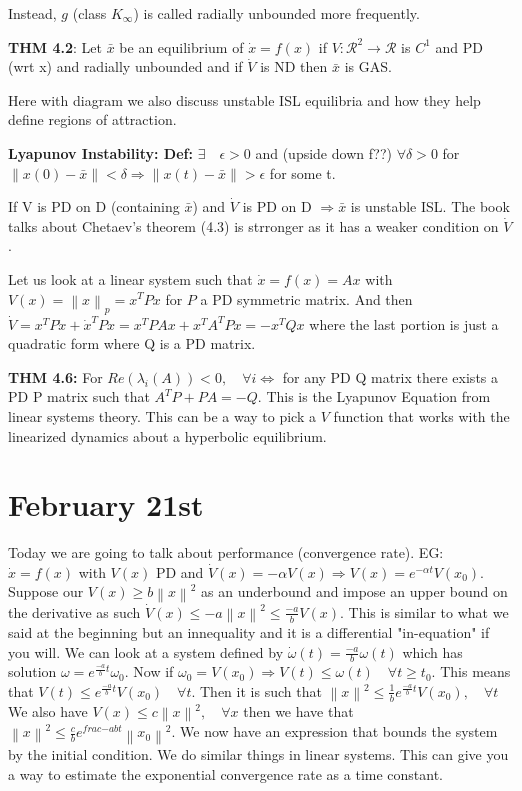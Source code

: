 \documentclass[11pt]{article}
\newcommand{\norm}[1]{\left\lVert#1\right\rVert}
\begin{document}
Instead, $g$ (class $K_\infty$) is called radially unbounded more frequently.

\textbf{THM 4.2}: Let $\bar{x}$ be an equilibrium of $\dot{x} = f(x)$ if $V:\mathcal{R}^2 \rightarrow \mathcal{R}$ is $C^1$ and PD (wrt x) and radially unbounded and if $\dot{V}$ is ND then $\bar{x}$ is GAS.


Here with diagram we also discuss unstable ISL equilibria and how they help define regions of attraction. 

\textbf{Lyapunov Instability: Def:} $\exists \quad \epsilon > 0 $ and (upside down f??) $\forall \delta > 0$ for $\norm{x(0) - \bar{x}} < \delta \Rightarrow \norm{x(t) - \bar{x}} > \epsilon $ for some t.

If V is PD on D (containing $\bar{x}$) and $\dot{V}$ is PD on D $\Rightarrow \bar{x}$ is unstable ISL. The book talks about Chetaev's theorem (4.3) is strronger as it has a weaker condition on $\dot{V}$.

Let us look at a linear system such that $\dot{x} = f(x) =Ax$ with $V(x) = \norm{x}_p = x^TPx$ for $P$ a PD symmetric matrix. And then $\dot{V} = x^TP\dot{x} + \dot{x}^TPx = x^TPAx + x^TA^TPx = -x^TQx$ where the last portion is just a quadratic form where Q is a PD matrix.

\textbf{THM 4.6:} For $Re(\lambda_i (A))<0, \quad \forall i \Leftrightarrow$ for any PD Q matrix there exists a PD P matrix such that $A^TP + PA = -Q$. This is the Lyapunov Equation from linear systems theory. This can be a way to pick a $V$ function that works with the linearized dynamics about a hyperbolic equilibrium. 




\section{February 21st}
Today we are going to talk about performance (convergence rate). EG: $\dot{x}=f(x)$ with $V(x)$  PD and $\dot{V}(x) = -\alpha V(x) \Rightarrow V(x) =e^{-\alpha t}V(x_0)$. Suppose our $V(x) \geq b\norm{x}^2$ as an underbound and impose an upper bound on the derivative as such $\dot{V}(x) \leq -a \norm{x}^2 \leq \frac{-a}{b}V(x)$. This is similar to what we said at the beginning but an innequality and it is a differential "in-equation" if you will. We can look at a system defined by $\dot{\omega}(t)= \frac{-a}{b}\omega(t)$ which has solution $\omega = e^{\frac{-a}{b}t} \omega_0$. Now if $\omega_0 = V(x_0) \Rightarrow V(t) \leq \omega(t) \quad \forall t\geq t_0$. This means that $V(t) \leq e^{\frac{-a}{b}t} V(x_0) \quad \forall t$. Then it is such that $\norm{x}^2 \leq \frac{1}{b} e^{\frac{-a}{b}t}V(x_0), \quad \forall t$ We also have $V(x)\leq c \norm{x}^2,\quad \forall x$ then  we have that $\norm{x}^2 \leq \frac{c}{b}e^{frac{-a}{b}t}\norm{x_0}^2$. We now have an expression that bounds the system by the initial condition. We do similar things in linear systems. This can give you a way to estimate the exponential convergence rate as a time constant.
\end{document}
